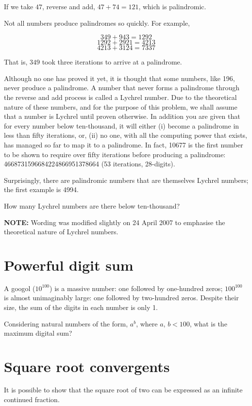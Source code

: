 If we take $47$, reverse and add, $47 + 74 = 121$, which is palindromic.

Not all numbers produce palindromes so quickly. For example,

$$349 + 943 = 1292$$
$$1292 + 2921 = 4213$$
$$4213 + 3124 = 7337$$

That is, $349$ took three iterations to arrive at a palindrome.

Although no one has proved it yet, it is thought that some numbers, like 196, never produce a palindrome. A number that never forms a palindrome through the reverse and add process is called a Lychrel number. Due to the theoretical nature of these numbers, and for the purpose of this problem, we shall assume that a number is Lychrel until proven otherwise. In addition you are given that for every number below ten-thousand, it will either (i) become a palindrome in less than fifty iterations, or, (ii) no one, with all the computing power that exists, has managed so far to map it to a palindrome. In fact, 10677 is the first number to be shown to require over fifty iterations before producing a palindrome: 4668731596684224866951378664 (53 iterations, 28-digits).

Surprisingly, there are palindromic numbers that are themselves Lychrel numbers; the first example is 4994.

How many Lychrel numbers are there below ten-thousand?

\textbf{NOTE:} Wording was modified slightly on 24 April 2007 to emphasise the theoretical nature of Lychrel numbers.

\section{Powerful digit sum} \label{pb.056}

A googol ($10^{100}$) is a massive number: one followed by one-hundred zeros; $100^{100}$ is almost unimaginably large: one followed by two-hundred zeros. Despite their size, the sum of the digits in each number is only 1.

Considering natural numbers of the form, $a^b$, where $a$, $b < 100$, what is the maximum digital sum?

\section{Square root convergents} \label{pb.057}
It is possible to show that the square root of two can be expressed as an infinite continued fraction.


